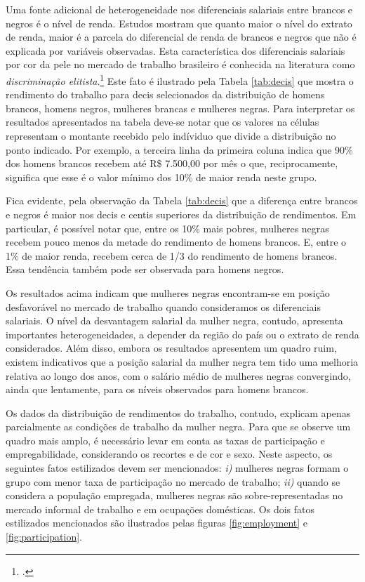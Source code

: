 \documentclass[12pt]{article}
\begin{document}
\par Uma fonte adicional de heterogeneidade nos diferenciais salariais entre brancos e negros é o nível de renda. Estudos mostram que quanto maior o nível do extrato de renda, maior é a parcela do diferencial de renda de brancos e negros que não é explicada por variáveis observadas. Esta característica dos diferenciais salariais por cor da pele no mercado de trabalho brasileiro é conhecida na literatura como \textit{discriminação elitista}.\footcite{soares2000perfil,campante2004desigualdade} Este fato é ilustrado pela Tabela \ref{tab:decis} que mostra o rendimento do trabalho para decis selecionados da distribuição de homens brancos, homens negros, mulheres brancas e mulheres negras. Para interpretar os resultados apresentados na tabela deve-se notar que os valores na células representam o montante recebido pelo indíviduo que divide a distribuição no ponto indicado. Por exemplo, a terceira linha da primeira coluna indica que 90\% dos homens brancos recebem até R\$ 7.500,00 por mês o que, reciprocamente, significa que esse é o valor mínimo dos 10\% de maior renda neste grupo.



\par Fica evidente, pela observação da Tabela \ref{tab:decis} que a diferença entre brancos e negros é maior nos decis e centis superiores da distribuição de rendimentos. Em particular, é possível notar que, entre os 10\% mais pobres, mulheres negras recebem pouco menos da metade do rendimento de homens brancos. E, entre o 1\% de maior renda, recebem cerca de 1/3 do rendimento de homens brancos. Essa tendência também pode ser observada para homens negros.

\par Os resultados acima indicam que mulheres negras encontram-se em posição desfavorável no mercado de trabalho quando consideramos os diferenciais salariais. O nível da desvantagem salarial da mulher negra, contudo, apresenta importantes heterogeneidades, a depender da região do país ou o extrato de renda considerados. Além disso, embora os resultados apresentem um quadro ruim, existem indicativos que a posição salarial da mulher negra tem tido uma melhoria relativa ao longo dos anos, com o salário médio de mulheres negras convergindo, ainda que lentamente, para os níveis observados para homens brancos. 

\par Os dados da distribuição de rendimentos do trabalho, contudo, explicam apenas parcialmente as condições de trabalho da mulher negra. Para que se observe um quadro mais amplo, é necessário levar em conta as taxas de participação e empregabilidade, considerando os recortes e de cor e sexo. Neste aspecto, os seguintes fatos estilizados devem ser mencionados: \textit{i)} mulheres negras formam o grupo com menor taxa de participação no mercado de trabalho; \textit{ii)} quando se considera a população empregada, mulheres negras são sobre-representadas no mercado informal de trabalho e em ocupações domésticas. Os dois fatos estilizados mencionados são ilustrados pelas figuras \ref{fig:employment} e \ref{fig:participation}.
\end{document}
